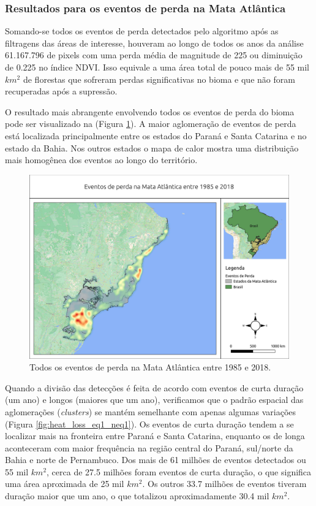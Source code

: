 \subsubsection{Resultados para os eventos de perda na Mata Atlântica}
\hspace{13pt} Somando-se todos os eventos de perda detectados pelo algoritmo após as filtragens das áreas de interesse, houveram ao longo de todos os anos da análise 61.167.796 de pixels com uma perda média de magnitude de 225 ou diminuição de 0.225 no índice NDVI. Isso equivale a uma área total de pouco mais de 55 mil $ km^2 $ de florestas que sofreram perdas significativas no bioma e que não foram recuperadas após a supressão.

O resultado mais abrangente envolvendo todos os eventos de perda do bioma pode ser visualizado na (Figura \ref{fig:heat_loss_masked85_maskedgain}). A maior aglomeração de eventos de perda está localizada principalmente entre os estados do Paraná e Santa Catarina e no estado da Bahia. Nos outros estados o mapa de calor mostra uma distribuição mais homogênea dos eventos ao longo do território. 

\begin{figure}[H]
    \centering
    \includegraphics[scale=.5]{images/heatmap_loss_masked85_maskedgain.pdf}
    \caption{Todos os eventos de perda na Mata Atlântica entre 1985 e 2018.}
    \label{fig:heat_loss_masked85_maskedgain}
\end{figure}

Quando a divisão das detecções é feita de acordo com eventos de curta duração (um ano) e longos (maiores que um ano), verificamos que o padrão espacial das aglomerações (\textit{clusters}) se mantém semelhante com apenas algumas variações (Figura \ref{fig:heat_loss_eq1_neq1}). Os eventos de curta duração tendem a se localizar mais na fronteira entre Paraná e Santa Catarina, enquanto os de longa aconteceram com maior frequência na região central do Paraná, sul/norte da Bahia e norte de Pernambuco. Dos mais de 61 milhões de eventos detectados ou 55 mil $ km^2 $, cerca de 27.5 milhões foram eventos de curta duração, o que significa uma área aproximada de 25 mil $ km^2 $. Os outros 33.7 milhões de eventos tiveram duração maior que um ano, o que totalizou aproximadamente 30.4 mil $ km^2 $.

